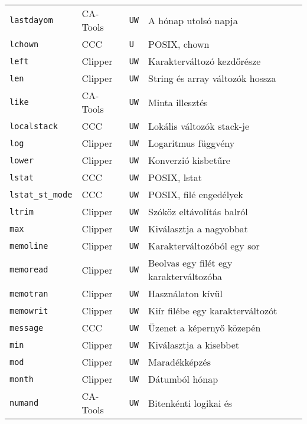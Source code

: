 \begin{tabular}{|l|l|l|l|}
\verb!lastdayom!                   & CA-Tools &  {\tt UW} & A hónap utolsó napja\\
\verb!lchown!                      & CCC      &  {\tt U~} & POSIX, chown\\
\verb!left!                        & Clipper  &  {\tt UW} & Karakterváltozó kezdőrésze\\
\verb!len!                         & Clipper  &  {\tt UW} & String és array változók hossza\\
\verb!like!                        & CA-Tools &  {\tt UW} & Minta illesztés\\
\verb!localstack!                  & CCC      &  {\tt UW} & Lokális változók stack-je\\
\verb!log!                         & Clipper  &  {\tt UW} & Logaritmus függvény\\
\verb!lower!                       & Clipper  &  {\tt UW} & Konverzió kisbetűre\\
\verb!lstat!                       & CCC      &  {\tt UW} & POSIX, lstat\\
\verb!lstat_st_mode!               & CCC      &  {\tt UW} & POSIX, filé engedélyek\\
\verb!ltrim!                       & Clipper  &  {\tt UW} & Szóköz eltávolítás balról\\
\verb!max!                         & Clipper  &  {\tt UW} & Kiválasztja a nagyobbat\\
\verb!memoline!                    & Clipper  &  {\tt UW} & Karakterváltozóból egy sor\\
\verb!memoread!                    & Clipper  &  {\tt UW} & Beolvas egy filét egy karakterváltozóba\\
\verb!memotran!                    & Clipper  &  {\tt UW} & Használaton kívül\\
\verb!memowrit!                    & Clipper  &  {\tt UW} & Kiír filébe egy karakterváltozót\\
\verb!message!                     & CCC      &  {\tt UW} & Üzenet a képernyő közepén\\   
\verb!min!                         & Clipper  &  {\tt UW} & Kiválasztja a kisebbet\\
\verb!mod!                         & Clipper  &  {\tt UW} & Maradékképzés\\   
\verb!month!                       & Clipper  &  {\tt UW} & Dátumból hónap\\   
\verb!numand!                      & CA-Tools &  {\tt UW} & Bitenkénti logikai és\\   

\end{tabular}
